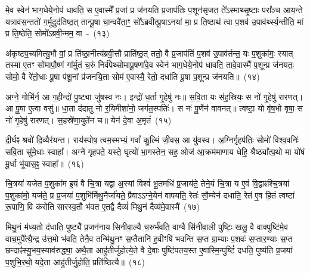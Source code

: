 मे॒व स्वेन॑ भाग॒\-धेये॒नोप॑ धावति॒ स ए॒वास्मै᳚ प्र॒जां प्र ज॑नयति प्र॒जा\-प॑तिः प॒शून॑सृजत॒ ते᳚\-ऽस्माथ्सृ॒ष्टाः परा᳚ञ्च आय॒न्ते यत्राव॑स॒न्ततो॑ ग॒र्मुदुद॑तिष्ठ॒त् तान्पू॒षा चा॒न्ववै॑ता॒ꣳ॒ सो᳚\-ऽब्रवीत्पू॒षा\-ऽनया॑ मा॒ प्र ति॒ष्ठाथ॑ त्वा प॒शव॑ उ॒पाव॑र्थ्स्य॒न्तीति॒ मां प्र ति॒ष्ठेति॒ सोमो᳚\-ऽब्रवी॒न्मम॒ \mbox{वा~-~(१३)\ip}

अ॑कृष्टप॒च्यमित्यु॒भौ वां॒ प्र ति॑ष्ठा॒नीत्य॑ब्रवी॒त्तौ प्राति॑ष्ठ॒त् ततो॒ वै प्र॒जा\-प॑तिं प॒शव॑ उ॒पाव॑र्तन्त॒ यः प॒शुका॑मः॒ स्यात् तस्मा॑ ए॒तꣳ सो॑मापौ॒ष्णं गा᳚र्मु॒तं च॒रुं निर्व॑पेथ्सोमापू॒षणा॑वे॒व स्वेन॑ भाग॒\-धेये॒नोप॑ धावति॒ तावे॒वास्मै॑ प॒शून्प्र ज॑नयतः॒ सोमो॒ वै रे॑तो॒धाः पू॒षा प॑शू॒नां प्र॑जनयि॒ता सोम॑ ए॒वास्मै॒ रेतो॒ दधा॑ति पू॒षा प॒शून्प्र ज॑नयति॥~(१४)\ip

{\anuvakamend[{व॒पे॒त्प्र॒जा\-प॑तिं॒ वै दधा॑ति पू॒षा त्रीणि॑ च}]}

अग्ने॒ गोभि॑र्न॒ आ ग॒हीन्दो॑ पु॒ष्ट्या जु॑षस्व नः। इन्द्रो॑ ध॒र्ता गृ॒हेषु॑ नः॥ स॒वि॒ता यः स॑ह॒स्रियः॒ स नो॑ गृ॒हेषु॑ रारणत्। आ पू॒षा ए॒त्वा वसु॑॥ धा॒ता द॑दातु नो र॒यिमीशा॑नो॒ जग॑त॒स्पतिः॑। स नः॑ पू॒र्णेन॑ वावनत्॥ त्वष्टा॒ यो वृ॑ष॒भो वृषा॒ स नो॑ गृ॒हेषु॑ रारणत्। स॒हस्रे॑णा॒युते॑न च॥ येन॑ दे॒वा अ॒मृतं॑~(१५)\ip

दी॒र्घꣴ श्रवो॑ दि॒व्यैर॑यन्त। राय॑स्पोष॒ त्वम॒स्मभ्यं॒ गवां᳚ कु॒ल्मिं जी॒वस॒ आ यु॑वस्व। अ॒ग्निर्गृ॒हप॑तिः॒ सोमो॑ विश्व॒वनिः॑ सवि॒ता सु॑\-मे॒धाः स्वाहा᳚। अग्ने॑ गृहपते॒ यस्ते॒ घृत्यो॑ भा॒गस्तेन॒ सह॒ ओज॑ आ॒\-क्रम॑\-मा\-णाय धेहि॒ श्रैष्ठ्या᳚त्प॒थो मा यो॑षं मू॒र्धा भू॑यास॒ꣴ॒ स्वाहा᳚॥~(१६)\ip

{\anuvakamend[{अ॒मृत॑म॒ष्टात्रिꣳ॑शच्च}]}

चि॒त्रया॑ यजेत प॒शुका॑म इ॒यं वै चि॒त्रा यद्वा अ॒स्यां विश्वं॑ भू॒तमधि॑ प्र॒जाय॑ते॒ तेने॒यं चि॒त्रा य ए॒वं वि॒द्वाꣴश्चि॒त्रया॑ प॒शुका॑मो॒ यज॑ते॒ प्र प्र॒जया॑ प॒शुभि॑र्मिथु॒नैर्जा॑यते॒ प्रैवा\-ऽऽ\-ग्ने॒येन॑ वापयति॒ रेतः॑ सौ॒म्येन॑ दधाति॒ रेत॑ ए॒व हि॒तं त्वष्टा॑ रू॒पाणि॒ वि क॑रोति सारस्व॒तौ भ॑वत ए॒तद्वै दैव्यं॑ मिथु॒नं दैव्य॑मे॒वास्मै॑~(१७)\ip

मिथु॒नं म॑ध्य॒तो द॑धाति॒ पुष्ट्यै᳚ प्र॒जन॑नाय सिनीवा॒ल्यै च॒रुर्भ॑वति॒ वाग्वै सि॑नीवा॒ली पुष्टिः॒ खलु॒ वै वाक्पुष्टि॑मे॒व वाच॒मुपै᳚त्यै॒न्द्र उ॑त्त॒मो भ॑वति॒ तेनै॒व तन्मि॑थु॒नꣳ स॒प्तैतानि॑ ह॒वीꣳषि॑ भवन्ति स॒प्त ग्रा॒म्याः प॒शवः॑ स॒प्तार॒ण्याः स॒प्त छन्दाꣴ॑स्यु॒भय॒स्याव॑रुद्ध्या॒ अथै॒ता आहु॑तीर्जुहोत्ये॒ते वै दे॒वाः पुष्टि॑पतय॒स्त ए॒वास्मि॒न्पुष्टिं॑ दधति॒ पुष्य॑ति प्र॒जया॑ प॒शुभि॒रथो॒ यदे॒ता आहु॑तीर्जु॒होति॒ प्रति॑ष्ठित्यै॥~(१८)\ip

{\anuvakamend[{अ॒स्मै॒ त ए॒व द्वाद॑श च}]}

